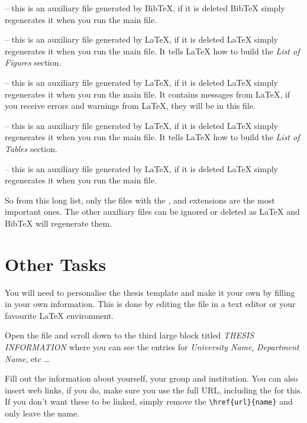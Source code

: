  -- this is an auxiliary file generated by BibTeX, if it is deleted BibTeX simply regenerates it when you run the main  file.

 -- this is an auxiliary file generated by \LaTeX{}, if it is deleted \LaTeX{} simply regenerates it when you run the main  file. It tells \LaTeX{} how to build the \emph{List of Figures} section.

 -- this is an auxiliary file generated by \LaTeX{}, if it is deleted \LaTeX{} simply regenerates it when you run the main  file. It contains messages from \LaTeX{}, if you receive errors and warnings from \LaTeX{}, they will be in this  file.

 -- this is an auxiliary file generated by \LaTeX{}, if it is deleted \LaTeX{} simply regenerates it when you run the main  file. It tells \LaTeX{} how to build the \emph{List of Tables} section.

 -- this is an auxiliary file generated by \LaTeX{}, if it is deleted \LaTeX{} simply regenerates it when you run the main  file.

So from this long list, only the files with the ,  and  extensions are the most important ones. The other auxiliary files can be ignored or deleted as \LaTeX{} and BibTeX will regenerate them.


\section{Other Tasks}\label{FillingFile}

You will need to personalise the thesis template and make it your own by filling in your own information. This is done by editing the  file in a text editor or your favourite LaTeX environment.

Open the file and scroll down to the third large block titled \emph{THESIS INFORMATION} where you can see the entries for \emph{University Name}, \emph{Department Name}, etc \ldots

Fill out the information about yourself, your group and institution. You can also insert web links, if you do, make sure you use the full URL, including the  for this. If you don't want these to be linked, simply remove the \verb|\href{url}{name}| and only leave the name.


